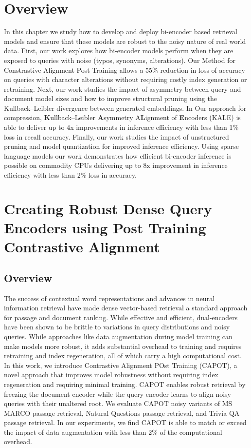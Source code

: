 \section{Overview}
In this chapter we study how to develop and deploy bi-encoder based retrieval models and ensure that these models are robust to the noisy nature of real world data. First, our work explores how bi-encoder models perform when they are exposed to queries with noise (typos, synonyms, alterations). Our Method for Constrastive Alignment Post Training allows a 55\% reduction in loss of accuracy on queries with character alterations without requiring costly index generation or retraining. Next, our work studies the impact of asymmetry between query and document model sizes and how to improve structural pruning using the Kullback–Leibler divergence between generated embeddings. In Our approach for compression, \textbf{K}ullback–Leibler \textbf{A}symmetry A\textbf{L}ignment of \textbf{E}ncoders (KALE) is able to deliver up to 4x improvements in inference efficiency with less than 1\% loss in recall accuracy. Finally, our work studies the impact of unstructured pruning and model quantization for improved inference efficiency. Using sparse language models our work demonstrates how efficient bi-encoder inference is possible on commodity CPUs delivering up to 8x improvement in inference efficiency with less than 2\% loss in accuracy. 
\section{Creating Robust Dense Query Encoders using Post Training Contrastive Alignment}
\subsection{Overview}
The success of contextual word representations and advances in neural information retrieval have made dense vector-based retrieval a standard approach for passage and document ranking. While effective and efficient, dual-encoders have been shown to be brittle to variations in query distributions and noisy queries. While approaches like data augmentation during model training can make models more robust, it adds substantial overhead to training and requires retraining and index regeneration, all of which carry a high computational cost. In this work, we introduce Contrastive Alignment POst Training (CAPOT), a novel approach that improves model robustness without requiring index regeneration and requiring minimal training. CAPOT enables robust retrieval by freezing the document encoder while the query encoder learns to align noisy queries with their unaltered root. We evaluate CAPOT noisy variants of MS MARCO passage retrieval, Natural Questions passage retrieval, and Trivia QA passage retrieval. In our experiments, we find CAPOT is able to match or exceed the impact of data augmentation with less than 2\% of the computational overhead. 

